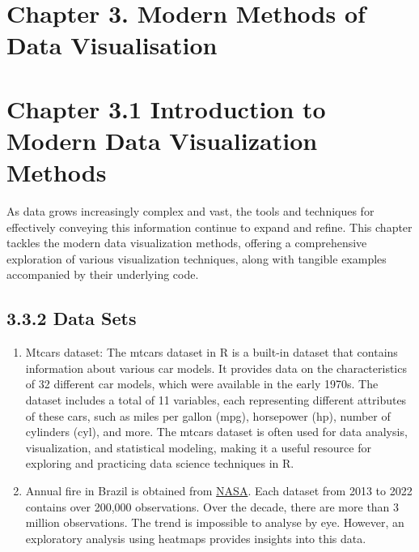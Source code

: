 \documentclass{article}\usepackage[]{graphicx}\usepackage[]{xcolor}
\makeatletter
\newenvironment{kframe}{%
 \def\at@end@of@kframe{}%
 \ifinner\ifhmode%
  \def\at@end@of@kframe{\end{minipage}}%
  \begin{minipage}{\columnwidth}%
 \fi\fi%
 \def\FrameCommand##1{\hskip\@totalleftmargin \hskip-\fboxsep
 \colorbox{shadecolor}{##1}\hskip-\fboxsep
     \hskip-\linewidth \hskip-\@totalleftmargin \hskip\columnwidth}%
 \MakeFramed {\advance\hsize-\width
   \@totalleftmargin\z@ \linewidth\hsize
   \@setminipage}}%
 {\par\unskip\endMakeFramed%
 \at@end@of@kframe}
\newenvironment{knitrout}{}{} %
\makeatother
\begin{document}
\begin{knitrout}
\color{fgcolor}\begin{kframe}


{\ttfamily\noindent\bfseries\color{errorcolor}{\#\# Error in library(forecast): there is no package called 'forecast'}}

{\ttfamily\noindent\bfseries\color{errorcolor}{\#\# Error in library(plotly): there is no package called 'plotly'}}

{\ttfamily\noindent\bfseries\color{errorcolor}{\#\# Error in library(sf): there is no package called 'sf'}}

{\ttfamily\noindent\bfseries\color{errorcolor}{\#\# Error in library(tmap): there is no package called 'tmap'}}\end{kframe}
\end{knitrout}

\section{Chapter 3. Modern Methods of Data Visualisation}

\section{Chapter 3.1 Introduction to Modern Data Visualization Methods}
As data grows increasingly complex and vast, the tools and techniques for effectively conveying this information continue to expand and refine. This chapter tackles the modern data visualization methods, offering a comprehensive exploration of various visualization techniques, along with tangible examples accompanied by their underlying code.

\subsection{3.3.2 Data Sets}
\begin{enumerate}
\item Mtcars dataset: The mtcars dataset in R is a built-in dataset that contains information about various car models. It provides data on the characteristics of 32 different car models, which were available in the early 1970s. The dataset includes a total of 11 variables, each representing different attributes of these cars, such as miles per gallon (mpg), horsepower (hp), number of cylinders (cyl), and more. The mtcars dataset is often used for data analysis, visualization, and statistical modeling, making it a useful resource for exploring and practicing data science techniques in R.
\item Annual fire in Brazil is obtained from \href{https://firms.modaps.eosdis.nasa.gov/}{NASA}. Each dataset from 2013 to 2022 contains over 200,000 observations. Over the decade, there are more than 3 million observations. The trend is impossible to analyse by eye. However, an exploratory analysis using heatmaps provides insights into this data.
\end{enumerate}
\end{document}

